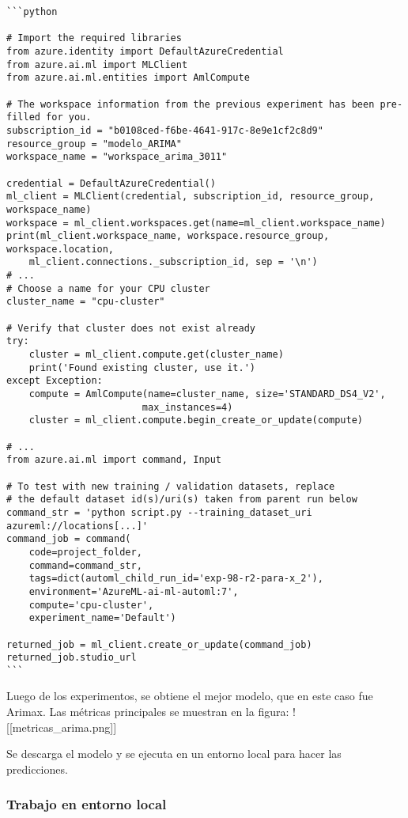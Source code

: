\begin{verbatim}
```python

# Import the required libraries
from azure.identity import DefaultAzureCredential
from azure.ai.ml import MLClient
from azure.ai.ml.entities import AmlCompute

# The workspace information from the previous experiment has been pre-filled for you.
subscription_id = "b0108ced-f6be-4641-917c-8e9e1cf2c8d9"
resource_group = "modelo_ARIMA"
workspace_name = "workspace_arima_3011"

credential = DefaultAzureCredential()
ml_client = MLClient(credential, subscription_id, resource_group, workspace_name)
workspace = ml_client.workspaces.get(name=ml_client.workspace_name)
print(ml_client.workspace_name, workspace.resource_group, workspace.location, 
    ml_client.connections._subscription_id, sep = '\n')
# ...
# Choose a name for your CPU cluster
cluster_name = "cpu-cluster"

# Verify that cluster does not exist already
try:
    cluster = ml_client.compute.get(cluster_name)
    print('Found existing cluster, use it.')
except Exception:
    compute = AmlCompute(name=cluster_name, size='STANDARD_DS4_V2',
                        max_instances=4)
    cluster = ml_client.compute.begin_create_or_update(compute)

# ...
from azure.ai.ml import command, Input

# To test with new training / validation datasets, replace 
# the default dataset id(s)/uri(s) taken from parent run below
command_str = 'python script.py --training_dataset_uri azureml://locations[...]'
command_job = command(
    code=project_folder,
    command=command_str,
    tags=dict(automl_child_run_id='exp-98-r2-para-x_2'),
    environment='AzureML-ai-ml-automl:7',
    compute='cpu-cluster',
    experiment_name='Default')

returned_job = ml_client.create_or_update(command_job)
returned_job.studio_url
```
\end{verbatim}

Luego de los experimentos, se obtiene el mejor modelo, que en este caso
fue Arimax. Las métricas principales se muestran en la figura:
!{[}{[}metricas\_arima.png{]}{]}

Se descarga el modelo y se ejecuta en un entorno local para hacer las
predicciones.

\subsubsection{Trabajo en entorno local}\label{trabajo-en-entorno-local}



